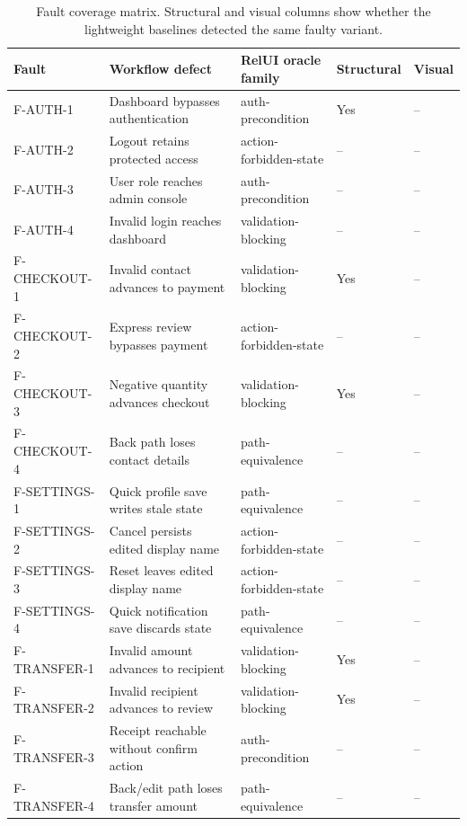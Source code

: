 \documentclass[sigconf,nonacm]{acmart}
\newcommand{\yes}{Yes}
\newcommand{\no}{--}
\begin{document}
\begin{table}[t]
  \centering
  \caption{Fault coverage matrix. Structural and visual columns show whether the lightweight baselines detected the same faulty variant.}
  \label{tab:fault-matrix}
  \scriptsize
  \begin{tabular}{lllll}
    \toprule
    Fault & Workflow defect & RelUI oracle family & Structural & Visual \\
    \midrule
    F-AUTH-1 & Dashboard bypasses authentication & auth-precondition & \yes & \no \\
    F-AUTH-2 & Logout retains protected access & action-forbidden-state & \no & \no \\
    F-AUTH-3 & User role reaches admin console & auth-precondition & \no & \no \\
    F-AUTH-4 & Invalid login reaches dashboard & validation-blocking & \no & \no \\
    F-CHECKOUT-1 & Invalid contact advances to payment & validation-blocking & \yes & \no \\
    F-CHECKOUT-2 & Express review bypasses payment & action-forbidden-state & \no & \no \\
    F-CHECKOUT-3 & Negative quantity advances checkout & validation-blocking & \yes & \no \\
    F-CHECKOUT-4 & Back path loses contact details & path-equivalence & \no & \no \\
    F-SETTINGS-1 & Quick profile save writes stale state & path-equivalence & \no & \no \\
    F-SETTINGS-2 & Cancel persists edited display name & action-forbidden-state & \no & \no \\
    F-SETTINGS-3 & Reset leaves edited display name & action-forbidden-state & \no & \no \\
    F-SETTINGS-4 & Quick notification save discards state & path-equivalence & \no & \no \\
    F-TRANSFER-1 & Invalid amount advances to recipient & validation-blocking & \yes & \no \\
    F-TRANSFER-2 & Invalid recipient advances to review & validation-blocking & \yes & \no \\
    F-TRANSFER-3 & Receipt reachable without confirm action & auth-precondition & \no & \no \\
    F-TRANSFER-4 & Back/edit path loses transfer amount & path-equivalence & \no & \no \\
    \bottomrule
  \end{tabular}
\end{table}
\end{document}
